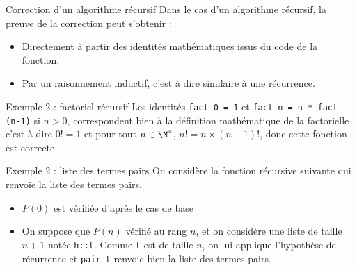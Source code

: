 \documentclass[10pt]{beamer}
\begin{document}
\begin{frame}[fragile]{\Ctitle}{\stitle}
    \begin{block}{Correction d'un algorithme récursif}
        Dans le cas d'un algorithme récursif, la preuve de la correction peut s'obtenir :
        \begin{itemize}
            \item<1-> Directement à partir des identités mathématiques issus du code de la fonction.
            \item<2-> Par un raisonnement inductif, c'est à dire similaire à une récurrence.
        \end{itemize}
    \end{block}
    \begin{exampleblock}{Exemple 2 : factoriel récursif}
         Les identités {\tt fact 0 = 1} et {\tt fact n =  n * fact (n-1)} si $n>0$, correspondent bien à la définition mathématique de la factorielle c'est à dire $0!=1$ et pour tout $n \in \N^*$, $n! = n \times (n-1)!$, donc cette fonction est correcte
    \end{exampleblock}
\end{frame}

\begin{frame}[fragile]{\Ctitle}{\stitle}
    \begin{exampleblock}{Exemple 2 : liste des termes pairs}
        {\small On considère la fonction récursive suivante qui renvoie la liste des termes pairs.}
        \begin{itemize}
            \item<5-> {\small $P(0)$ est vérifiée d'après le cas de base}
            \item<6-> {\small On suppose que $P(n)$ vérifié au rang $n$, et on considère une liste de taille $n+1$ notée {\tt h::t}. Comme  {\tt t} est de taille $n$, on lui applique l'hypothèse de récurrence et {\tt pair t} renvoie bien la liste des termes pairs.}
        \end{itemize}
    \end{exampleblock}
\end{frame}
\end{document}

